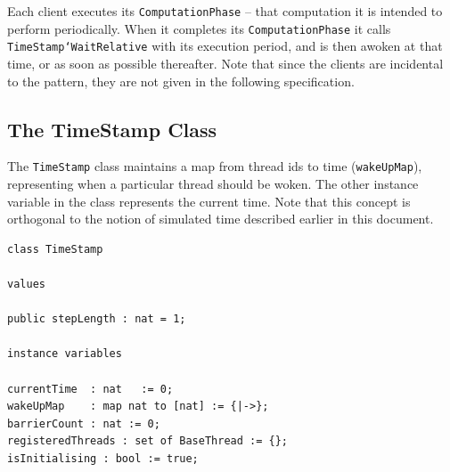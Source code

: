 \documentclass{overturerepchap}
\begin{document}
Each client executes its
\texttt{ComputationPhase} -- that computation it is intended to perform
periodically. When it completes its \texttt{ComputationPhase} it calls 
\texttt{TimeStamp`WaitRelative} with its
execution period, and is then awoken at that time, or as soon as
possible thereafter. Note that since the clients are incidental to the 
pattern, they are not given in the following specification.


\subsection{The TimeStamp Class}

The \texttt{TimeStamp} class maintains a map from thread ids to 
time (\texttt{wakeUpMap}), representing when a particular thread 
should be woken. The other instance variable in the class
represents the current time. Note that this concept is orthogonal to
the notion of simulated time described earlier in this document.



\begin{lstlisting}
class TimeStamp

values

public stepLength : nat = 1;

instance variables

currentTime  : nat   := 0;
wakeUpMap    : map nat to [nat] := {|->};
barrierCount : nat := 0;
registeredThreads : set of BaseThread := {};
isInitialising : bool := true;
\end{lstlisting}
\end{document}
